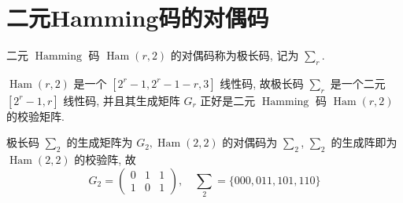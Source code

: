 \section{二元Hamming码的对偶码}
\begin{definition}[极长码]
    二元 $ \operatorname{Hamming} $ 码 $ \operatorname{Ham}(r, 2) $ 的对偶码称为极长码, 记为 $ \sum_{r} $.
\end{definition}
\begin{remark}
    $ \operatorname{Ham}(r, 2) $ 是一个 $ \left[2^{r}-1,2^{r}-1-r, 3\right] $ 线性码, 故极长码 $ \sum_{r} $ 是一个二元 $ \left[2^{r}-1, r\right] $ 线性码, 并且其生成矩阵 $ G_{r} $ 正好是二元 $ \operatorname{Hamming} $ 码 $ \operatorname{Ham}(r, 2) $ 的校验矩阵.
    
\end{remark}
\begin{example}
    极长码 $ \sum_{2} $ 的生成矩阵为 $ G_{2}, \operatorname{Ham}(2,2) $ 的对偶码为 $ \sum_{2} $, $ \sum_{2} $ 的生成阵即为 $ \operatorname{Ham}(2,2) $ 的校验阵, 故
$$
G_{2}=\left(\begin{array}{lll}
0 & 1 & 1 \\
1 & 0 & 1
\end{array}\right), \quad \sum_{2}=\{000,011,101,110\}
$$
\end{example}

